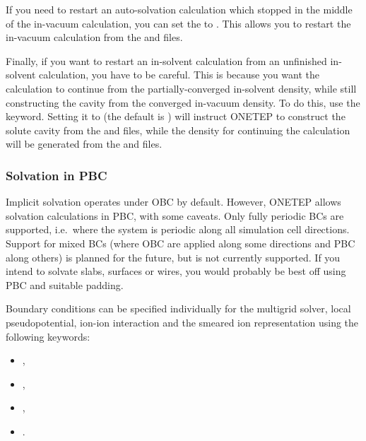 \documentclass[letterpaper,10pt,english]{sphinxmanual}
\begin{document}
If you need to restart an auto-solvation calculation which stopped in
the middle of the in-vacuum calculation, you can set the
 to . This allows you to restart the
in-vacuum calculation from the  and
 files.

Finally, if you want to restart an in-solvent calculation from an
unfinished in-solvent calculation, you have to be careful. This is
because you want the calculation to continue from the
partially-converged in-solvent density, while still constructing the
cavity from the converged in-vacuum density. To do this, use the
 keyword. Setting it to  (the default
is ) will instruct ONETEP to construct the solute cavity from the
 and  files, while the density
for continuing the calculation will be generated from the  and
 files.


\subsubsection{Solvation in PBC}
\label{\detokenize{implicit_solvation_v3:solvation-in-pbc}}
Implicit solvation operates under OBC by default. However, ONETEP allows
solvation calculations in PBC, with some caveats. Only fully periodic
BCs are supported, i.e. where the system is periodic along all
simulation cell directions. Support for mixed BCs (where OBC are applied
along some directions and PBC along others) is planned for the future,
but is not currently supported. If you intend to solvate slabs, surfaces
or wires, you would probably be best off using PBC and suitable padding.

Boundary conditions can be specified individually for the multigrid
solver, local pseudopotential, ion-ion interaction and the smeared ion
representation using the following keywords:
\begin{itemize}
\item {} 
,

\item {} 
,

\item {} 
,

\item {} 
.

\end{itemize}
\end{document}
